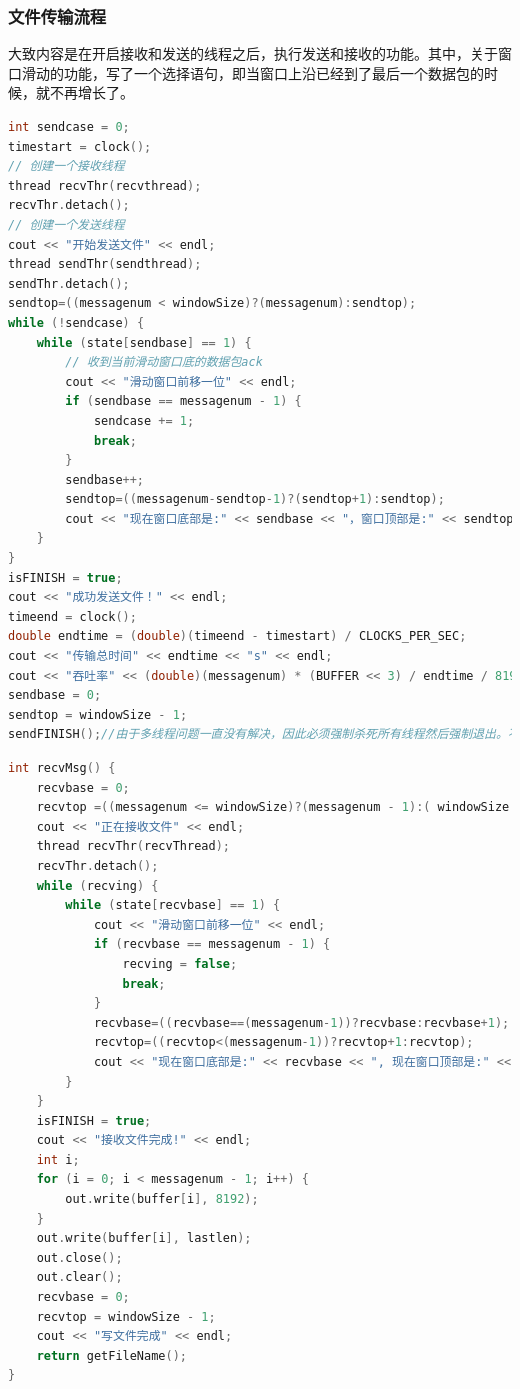 \documentclass[UTF8,a4paper,10pt]{ctexart}
\begin{document}
\subsubsection{文件传输流程}
大致内容是在开启接收和发送的线程之后，执行发送和接收的功能。其中，关于窗口滑动的功能，写了一个选择语句，即当窗口上沿已经到了最后一个数据包的时候，就不再增长了。
\begin{lstlisting}[title=客户端发送文件,frame=trbl,language={C++}]
int sendcase = 0;
timestart = clock();
// 创建一个接收线程
thread recvThr(recvthread);
recvThr.detach();
// 创建一个发送线程
cout << "开始发送文件" << endl;
thread sendThr(sendthread);
sendThr.detach();
sendtop=((messagenum < windowSize)?(messagenum):sendtop);
while (!sendcase) {
    while (state[sendbase] == 1) {
        // 收到当前滑动窗口底的数据包ack
        cout << "滑动窗口前移一位" << endl;
        if (sendbase == messagenum - 1) {
            sendcase += 1;
            break;
        }
        sendbase++;
        sendtop=((messagenum-sendtop-1)?(sendtop+1):sendtop);
        cout << "现在窗口底部是:" << sendbase << "，窗口顶部是:" << sendtop << endl;
    }
}
isFINISH = true;
cout << "成功发送文件！" << endl;
timeend = clock();
double endtime = (double)(timeend - timestart) / CLOCKS_PER_SEC;
cout << "传输总时间" << endtime << "s" << endl;
cout << "吞吐率" << (double)(messagenum) * (BUFFER << 3) / endtime / 8192  << "kbps" << endl;
sendbase = 0;
sendtop = windowSize - 1;
sendFINISH();//由于多线程问题一直没有解决，因此必须强制杀死所有线程然后强制退出。不能实现多文件发送机制。具体解释见server端的注释
\end{lstlisting}

\begin{lstlisting}[title=服务器接收文件,frame=trbl,language={C++}]
int recvMsg() {
    recvbase = 0;
    recvtop =((messagenum <= windowSize)?(messagenum - 1):( windowSize - 1));
    cout << "正在接收文件" << endl;
    thread recvThr(recvThread);
    recvThr.detach();
    while (recving) {
        while (state[recvbase] == 1) {
            cout << "滑动窗口前移一位" << endl;
            if (recvbase == messagenum - 1) {
                recving = false;
                break;
            }
            recvbase=((recvbase==(messagenum-1))?recvbase:recvbase+1);
            recvtop=((recvtop<(messagenum-1))?recvtop+1:recvtop);
            cout << "现在窗口底部是:" << recvbase << ", 现在窗口顶部是:" << recvtop << endl;
        }
    }
    isFINISH = true;
    cout << "接收文件完成!" << endl;
    int i;
    for (i = 0; i < messagenum - 1; i++) {
        out.write(buffer[i], 8192);
    }
    out.write(buffer[i], lastlen);
    out.close();
    out.clear();
    recvbase = 0;
    recvtop = windowSize - 1;
    cout << "写文件完成" << endl;
    return getFileName();
}
\end{lstlisting}
\end{document}
